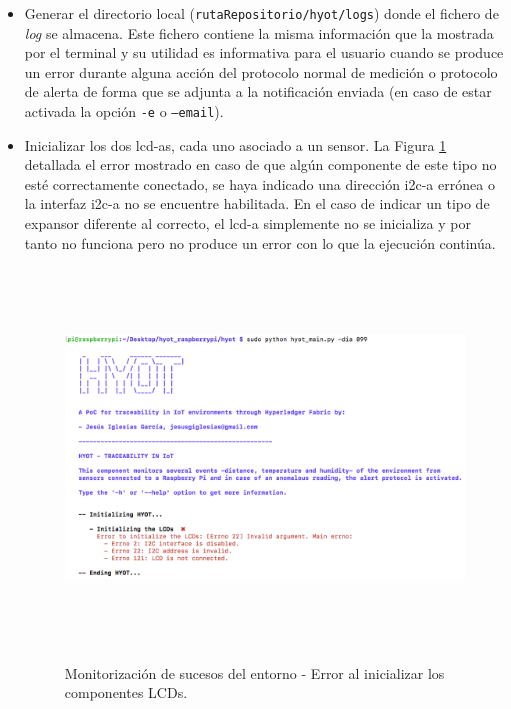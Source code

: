 \documentclass[12pt,a4paper, twoside]{report}
\begin{document}
	 \begin{itemize}
	 	\item Generar el directorio local (\texttt{rutaRepositorio/hyot/logs}) donde el fichero de \textit{log} se almacena. Este fichero contiene la misma información que la mostrada por el terminal y su utilidad es informativa para el usuario cuando se produce un error durante alguna acción del protocolo normal de medición o protocolo de alerta de forma que se adjunta a la notificación enviada (en caso de estar activada la opción \texttt{-e} o \texttt{--email}).
	 	
	 	\item Inicializar los dos \glspl{lcd-a}, cada uno asociado a un \gls{sensor}. La Figura \ref{fig:userguide_monitoring_lcdError} detallada el error mostrado en caso de que algún componente de este tipo no esté correctamente conectado, se haya indicado una dirección \gls{i2c-a} errónea o la interfaz \gls{i2c-a} no se encuentre habilitada. En el caso de indicar un tipo de expansor diferente al correcto, el \gls{lcd-a} simplemente no se inicializa y por tanto no funciona pero no produce un error con lo que la ejecución continúa.
	 	
	 \begin{figure}[!ht]   
		\caption{Monitorización de sucesos del entorno - Error al inicializar los componentes LCDs.} 
		\begin{center} 
			\includegraphics[width=14cm,height=10cm]{Images/userGuide/monitoring/lcdError} \\
			\label{fig:userguide_monitoring_lcdError} 
		\end{center}  
	\end{figure}
		 	

\end{itemize}
\end{document}
